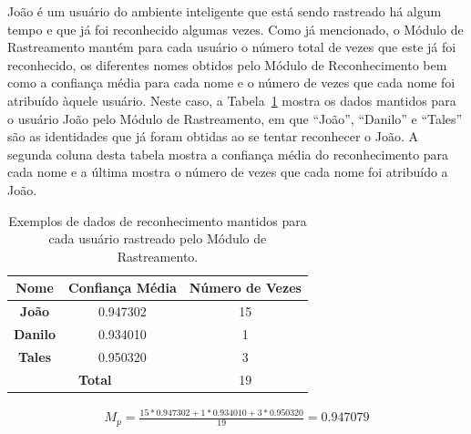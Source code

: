 	\begin{description}
 		João é um usuário do ambiente inteligente que está sendo rastreado há algum tempo e que já foi reconhecido algumas vezes. Como já mencionado, o Módulo de Rastreamento mantém para cada usuário o número total de vezes que este já foi reconhecido, os diferentes nomes obtidos pelo Módulo de Reconhecimento bem como a confiança média para cada nome e o número de vezes que cada nome foi atribuído àquele usuário. Neste caso, a Tabela~\ref{tab:joao} mostra os dados mantidos para o usuário João pelo Módulo de Rastreamento, em que ``João'', ``Danilo'' e ``Tales'' são as identidades que já foram obtidas ao se tentar reconhecer o João. A segunda coluna desta tabela mostra a confiança média do reconhecimento para cada nome e a última mostra o número de vezes que cada nome foi atribuído a João.

	\end{description}

	\begin{table}[htb]
		\begin{center}
			\caption{Exemplos de dados de reconhecimento mantidos para cada usuário rastreado pelo Módulo de Rastreamento.}
			\label{tab:joao}
			\begin{tabular}{|c|c|c|}
				\hline \bf Nome & Confiança Média & Número de Vezes \\
				\hline \hline \bf João & 0.947302 & 15 \\
				\hline \bf  Danilo & 0.934010 & 1 \\
				\hline \bf Tales & 0.950320 & 3 \\
				\hline
				\hline \multicolumn{2}{|c|}{\bf Total}  & 19 \\
				\hline
			\end{tabular}
		\end{center}
	\end{table}

	\begin{align}
		\label{eq:joao}
		M_p = \frac{15 * 0.947302 + 1 * 0.934010 + 3 * 0.950320}{19} = 0.947079
	\end{align}

